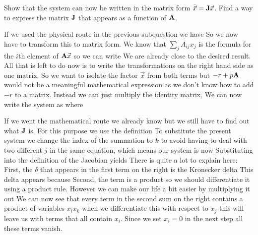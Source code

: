 \subquestion 
Show that the system can now be written in the matrix form $\dot{\vec{x}}={\bf J} \vec{x}$. Find a way to express the matrix $\bf J$ that appears as a function of $\bf A$. 

\solution 
If we used the physical route in the previous subquestion we have 
So we now have to transform this to matrix form. We know that $\sum_j A_{ij} x_j$ is the formula for the $i$th element of ${\bf A}\vec{x}$ so we can write 
We are already close to the desired result. All that is left to do now is to write the transformations on the right hand side as one matrix. So we want to isolate the factor $\vec{x}$ from both terms but $-r+p{\bf A}$ would not be a meaningful mathematical expression as we don't know how to add $-r$ to a matrix. Instead we can just multiply the identity matrix, 
We can now write the system as 
where 

If we went the mathematical route we already know
but we still have to find out what $\bf J$ is. For this purpose we use the definition 
To substitute the present system we change the index of the summation to $k$ to avoid having to deal with two different $j$ in the same equation, which means our system is now
Substituting into the definition of the Jacobian yields
There is quite a lot to explain here: First, the $\delta$ that appears in the first term on the right is the Kronecker delta
This delta appears because 
Second, the term  
is a product so we should differentiate it using a product rule. However we can make our life a bit easier by multiplying it out 
We can now see that every term in the second sum on the right contains a product of variables $x_ix_k$ when we differentiate this with respect to $x_j$ this will leave us with terms that all contain $x_i$. Since we set $x_i=0$ in the next step all these terms vanish. 

